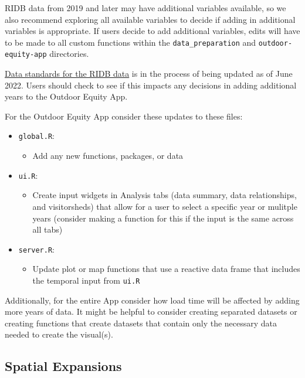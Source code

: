 \documentclass[
  11 pt,
  openany]{book}
\providecommand{\tightlist}{%
  \setlength{\itemsep}{0pt}\setlength{\parskip}{0pt}}
\begin{document}
RIDB data from 2019 and later may have additional variables available, so we also recommend exploring all available variables to decide if adding in additional variables is appropriate. If users decide to add additional variables, edits will have to be made to all custom functions within the \texttt{data\_preparation} and \texttt{outdoor-equity-app} directories.

\href{https://ridb.recreation.gov/standards}{Data standards for the RIDB data} is in the process of being updated as of June 2022. Users should check to see if this impacts any decisions in adding additional years to the Outdoor Equity App.

For the Outdoor Equity App consider these updates to these files:

\begin{itemize}
\item
  \texttt{global.R}:

  \begin{itemize}
  \tightlist
  \item
    Add any new functions, packages, or data
  \end{itemize}
\item
  \texttt{ui.R}:

  \begin{itemize}
  \tightlist
  \item
    Create input widgets in Analysis tabs (data summary, data relationships, and visitorsheds) that allow for a user to select a specific year or mulitple years (consider making a function for this if the input is the same across all tabs)
  \end{itemize}
\item
  \texttt{server.R}:

  \begin{itemize}
  \tightlist
  \item
    Update plot or map functions that use a reactive data frame that includes the temporal input from \texttt{ui.R}
  \end{itemize}
\end{itemize}

Additionally, for the entire App consider how load time will be affected by adding more years of data. It might be helpful to consider creating separated datasets or creating functions that create datasets that contain only the necessary data needed to create the visual(s).

\hypertarget{spatial-expansions}{%
\subsection{Spatial Expansions}\label{spatial-expansions}}
\end{document}
